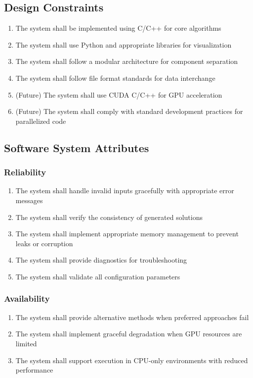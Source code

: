 \documentclass[conference]{IEEEtran}
\begin{document}
\subsection{Design Constraints}
\begin{enumerate}
    \item The system shall be implemented using C/C++ for core algorithms
    \item The system shall use Python and appropriate libraries for visualization
    \item The system shall follow a modular architecture for component separation
    \item The system shall follow file format standards for data interchange
    \item (Future) The system shall use CUDA C/C++ for GPU acceleration
    \item (Future) The system shall comply with standard development practices for parallelized code
\end{enumerate}

\subsection{Software System Attributes}

\subsubsection{Reliability}
\begin{enumerate}
    \item The system shall handle invalid inputs gracefully with appropriate error messages
    \item The system shall verify the consistency of generated solutions
    \item The system shall implement appropriate memory management to prevent leaks or corruption
    \item The system shall provide diagnostics for troubleshooting
    \item The system shall validate all configuration parameters
\end{enumerate}

\subsubsection{Availability}
\begin{enumerate}
    \item The system shall provide alternative methods when preferred approaches fail
    \item The system shall implement graceful degradation when GPU resources are limited
    \item The system shall support execution in CPU-only environments with reduced performance
\end{enumerate}
\end{document}
